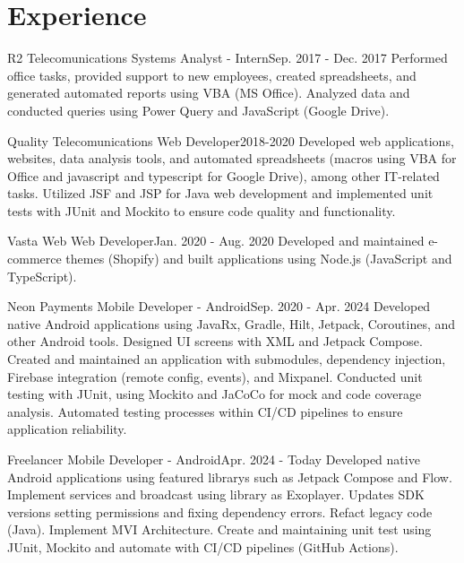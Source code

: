 \section{Experience}
  \resumeSubHeadingListStart

    \resumeSubheading
      {R2 Telecomunications}{}
      {Systems Analyst - Intern}{Sep. 2017 - Dec. 2017}
      \resumeItemListStart
          {Performed office tasks, provided support to new employees, created spreadsheets, and generated automated reports using VBA (MS Office). Analyzed data and conducted queries using Power Query and JavaScript (Google Drive).}
      \resumeItemListEnd

    \resumeSubheading
      {Quality Telecomunications}{}
      {Web Developer}{2018-2020}
      \resumeItemListStart
          {Developed web applications, websites, data analysis tools, and automated spreadsheets (macros using VBA for Office and javascript and typescript for Google Drive), among other IT-related tasks. Utilized JSF and JSP for Java web development and implemented unit tests with JUnit and Mockito to ensure code quality and functionality.}
      \resumeItemListEnd

    \resumeSubheading
      {Vasta Web}{}
      {Web Developer}{Jan. 2020 - Aug. 2020}
      \resumeItemListStart
          {Developed and maintained e-commerce themes (Shopify) and built applications using Node.js (JavaScript and TypeScript).}
      \resumeItemListEnd

    \resumeSubheading
      {Neon Payments}{}
      {Mobile Developer - Android}{Sep. 2020 - Apr. 2024}
      \resumeItemListStart
          {Developed native Android applications using JavaRx, Gradle, Hilt, Jetpack, Coroutines, and other Android tools. Designed UI screens with XML and Jetpack Compose. Created and maintained an application with submodules, dependency injection, Firebase integration (remote config, events), and Mixpanel.}
          {Conducted unit testing with JUnit, using Mockito and JaCoCo for mock and code coverage analysis. Automated testing processes within CI/CD pipelines to ensure application reliability.}
      \resumeItemListEnd

    \resumeSubheading
      {Freelancer}{}
      {Mobile Developer - Android}{Apr. 2024 - Today}
      \resumeItemListStart
          {Developed native Android applications using featured librarys such as Jetpack Compose and Flow. Implement services and broadcast using library as Exoplayer. Updates SDK versions setting permissions and fixing dependency errors. Refact legacy code (Java). Implement MVI Architecture. Create and maintaining unit test using JUnit, Mockito and automate with CI/CD pipelines (GitHub Actions).}
      \resumeItemListEnd

  \resumeSubHeadingListEnd
